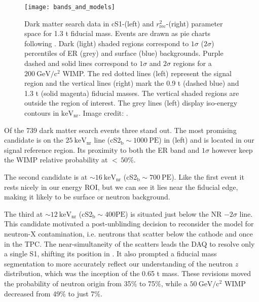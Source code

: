 \begin{figure}
\centering
\texttt{[image: bands\_and\_models]}
\caption[Dark matter search data in cS1-\cstwob and $r_{\mathrm{rec}}^2$-\cstwob parameter space for 1.3 t fiducial
mass with background and signal probabilities.]{Dark matter search data in cS1-\cstwob (left) and $r_{\mathrm{rec}}^2$-\cstwob (right)
parameter space for 1.3 t fiducial
mass.  Events are drawn as pie charts following .  Dark (light) shaded regions correspond to
$1 \sigma$ ($2 \sigma$) percentiles of ER (grey) and surface (blue) backgrounds.  Purple dashed and solid lines
correspond to $1 \sigma$ and $2 \sigma$ regions for a $200\ \mathrm{GeV/c^2}$ WIMP.  The red dotted lines (left) represent the signal region
and the vertical lines (right) mark the 0.9 t (dashed blue) and 1.3 t (solid magenta) fiducial masses.  The vertical shaded
regions are outside the region of interest.  The grey lines (left) display iso-energy contours in $\mathrm{keV_{nr}}$.  Image credit:
.}
\label{fig:dark_matter_results_bands}
\end{figure}

Of the 739 dark matter search events three stand out.  The most promising candidate is
on the $25\ \mathrm{keV_{nr}}$ line (cS2$_{\mathrm{b}} \sim 1000\ \mathrm{PE}$) in  (left) and is
located in our signal reference region.  Its proximity to both the ER band and $1 \sigma$ however keep the WIMP relative probability at
${<}\, 50\%$.

The second candidate is at ${\sim} 16\ \mathrm{keV_{nr}}$ (cS2$_{\mathrm{b}} \sim 700\ \mathrm{PE}$).  Like the first event it
rests nicely in our energy ROI, but we can see it lies near the fiducial edge, making it likely to be surface or
neutron background.

The third at ${\sim} 12\ \mathrm{keV_{nr}}$ (cS2$_{\mathrm{b}} \sim 400 \mathrm{PE}$) is situated just below the NR
$-2 \sigma$ line.  This candidate motivated a post-unblinding decision to reconsider the model for neutron-X contamination, i.e. neutrons
that scatter below the cathode and once in the TPC.  The near-simultaneity of the scatters leads the DAQ to resolve only a single
S1, shifting its position in .  It also prompted
a fiducial mass segmentation to more accurately reflect our understanding of the neutron $z$ distribution, which was the inception of the
0.65 t mass.  These revisions moved the probability of neutron origin from 35\% to 75\%, while a $50\ \mathrm{GeV/c^2}$ WIMP
decreased from 49\% to just 7\%.


